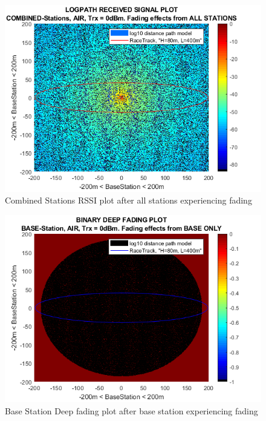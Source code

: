 \begin{figure}[H]
\centering
\includegraphics[width=\linewidth]{theory/fading/fig/logpathReceivedSignal_combinedStations_allStations.png}
\caption{Combined Stations RSSI plot after all stations experiencing fading}
\label{fig:logpathReceivedSignal_combinedStations_allStations}
\end{figure}

\begin{figure}[H]
	\centering
	\includegraphics[width=\linewidth]{theory/fading/fig/binaryDeepFading_baseStation_baseOnly.png}
	\caption{Base Station Deep fading plot after base station experiencing fading}
	\label{fig:binaryDeepFading_baseStation_baseOnly}
\end{figure}


